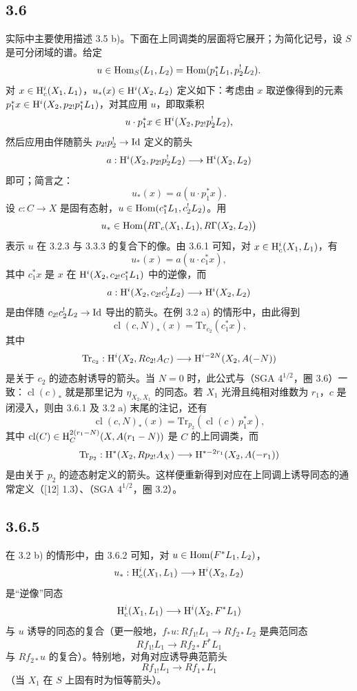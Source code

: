 \subsection*{3.6}
实际中主要使用描述 3.5 b)。下面在上同调类的层面将它展开；为简化记号，设 $S$ 是可分闭域的谱。给定
\[
u\in\operatorname{Hom}_S(L_1,L_2)=\operatorname{Hom}(p_1^*L_1,p_2^!L_2).
\]
对 $x\in\allowbreak \mathrm{H}_c^i(X_1,L_1)$，$u_*(x)\in\allowbreak \mathrm{H}^i(X_2,L_2)$ 定义如下：考虑由 $x$ 取逆像得到的元素 $p_1^*x\in\allowbreak \mathrm{H}^i(X_2,p_{2!}p_1^*L_1)$，对其应用 $u$，即取乘积
\[
u\cdot p_1^*x\in \mathrm{H}^i(X_2,p_{2!}p_2^!L_2),
\]
然后应用由伴随箭头 $p_{2!}p_2^!\to\mathrm{Id}$ 定义的箭头
\[
a:\mathrm{H}^i(X_2,p_{2!}p_2^!L_2)\longrightarrow \mathrm{H}^i(X_2,L_2)
\]
即可；简言之：
\begin{equation}
u_*(x)=a(u\cdot p_1^*x).
\tag{3.6.1}
\end{equation}
设 $c:C\to X$ 是固有态射，$u\in\operatorname{Hom}(c_1^*L_1,c_2^!L_2)$。用
\[
u_*\in\operatorname{Hom}\bigl(R\Gamma_c(X_1,L_1),R\Gamma(X_2,L_2)\bigr)
\]
表示 $u$ 在 3.2.3 与 3.3.3 的复合下的像。由 3.6.1 可知，对 $x\in\mathrm{H}_c^i(X_1,L_1)$，有
\begin{equation}
u_*(x)=a(u\cdot c_1^*x),
\tag{3.6.2}
\end{equation}
其中 $c_1^*x$ 是 $x$ 在 $\mathrm{H}^i(X_2,c_{2!}c_1^*L_1)$ 中的逆像，而
\[
a:\mathrm{H}^i(X_2,c_{2!}c_2^!L_2)\longrightarrow \mathrm{H}^i(X_2,L_2)
\]
是由伴随 $c_{2!}c_2^!L_2\to\mathrm{Id}$ 导出的箭头。在例 3.2 a) 的情形中，由此得到
\begin{equation}
\operatorname{cl}(c,N)_*(x)=\mathrm{Tr}_{c_2}(c_1^*x),
\tag{3.6.3}
\end{equation}
其中
\[
\mathrm{Tr}_{c_2}:\mathrm{H}^i(X_2,Rc_{2!}A_C)\longrightarrow\mathrm{H}^{i-2N}(X_2,A(-N))
\]
是关于 $c_2$ 的迹态射诱导的箭头。当 $N=0$ 时，此公式与（SGA $4^{1/2}$，圈 3.6）一致：$\operatorname{cl}(c)_*$ 就是那里记为 $\eta_{X_2,X_1}$ 的同态。若 $X_1$ 光滑且纯相对维数为 $r_1$，$c$ 是闭浸入，则由 3.6.1 及 3.2 a) 末尾的注记，还有
\begin{equation}
\operatorname{cl}(c,N)_*(x)=\mathrm{Tr}_{p_2}(\operatorname{cl}(c)\,p_1^*x),
\tag{3.6.4}
\end{equation}
其中 $\operatorname{cl}(C)\in \mathrm{H}_C^{2(r_1-N)}(X,A(r_1-N))$ 是 $C$ 的上同调类，而
\[
\mathrm{Tr}_{p_2}:\mathrm{H}^*(X_2,Rp_{2!}A_X)\longrightarrow \mathrm{H}^{*-2r_1}(X_2,A(-r_1))
\]
是由关于 $p_2$ 的迹态射定义的箭头。这样便重新得到对应在上同调上诱导同态的通常定义（[12] 1.3）、（SGA $4^{1/2}$，圈 3.2）。

\subsection*{3.6.5}
在 3.2 b) 的情形中，由 3.6.2 可知，对 $u\in\operatorname{Hom}(F^*L_1,L_2)$，
\[
u_*:\mathrm{H}_c^i(X_1,L_1)\longrightarrow \mathrm{H}^i(X_2,L_2)
\]
是“逆像”同态
\[
\mathrm{H}_c^i(X_1,L_1)\longrightarrow \mathrm{H}^i(X_2,F^*L_1)
\]
与 $u$ 诱导的同态的复合（更一般地，$f_*u:Rf_{1!}L_1\to Rf_{2*}L_2$ 是典范同态
\[
Rf_{1!}L_1\longrightarrow Rf_{2*}F^*L_1
\]
与 $Rf_{2*}u$ 的复合）。特别地，对角对应诱导典范箭头
\[
Rf_{1!}L_1\longrightarrow Rf_{1*}L_1
\]
（当 $X_1$ 在 $S$ 上固有时为恒等箭头）。

